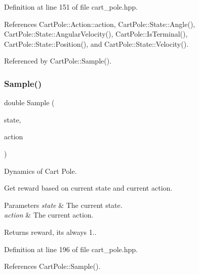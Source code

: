 Definition at line 151 of file cart\+\_\+pole.\+hpp.



References Cart\+Pole\+::\+Action\+::action, Cart\+Pole\+::\+State\+::\+Angle(), Cart\+Pole\+::\+State\+::\+Angular\+Velocity(), Cart\+Pole\+::\+Is\+Terminal(), Cart\+Pole\+::\+State\+::\+Position(), and Cart\+Pole\+::\+State\+::\+Velocity().



Referenced by Cart\+Pole\+::\+Sample().

\mbox{\label{classmlpack_1_1rl_1_1CartPole_af2bb860eaefeaa62a40f5cf940793704}} 
\subsubsection{Sample()\hspace{0.1cm}{\footnotesize\ttfamily [2/2]}}
{\footnotesize\ttfamily double Sample (\begin{DoxyParamCaption}\item[{const \textbf{ State} \&}]{state,  }\item[{const \textbf{ Action} \&}]{action }\end{DoxyParamCaption})\hspace{0.3cm}{\ttfamily [inline]}}



Dynamics of Cart Pole. 

Get reward based on current state and current action.


\begin{DoxyParams}{Parameters}
{\em state} & The current state. \\
\hline
{\em action} & The current action. \\
\hline
\end{DoxyParams}
\begin{DoxyReturn}{Returns}
reward, it\textquotesingle{}s always 1.. 
\end{DoxyReturn}


Definition at line 196 of file cart\+\_\+pole.\+hpp.



References Cart\+Pole\+::\+Sample().

\mbox{\label{classmlpack_1_1rl_1_1CartPole_a5fe06563064ebcee88c593e1673f03d4}} 
